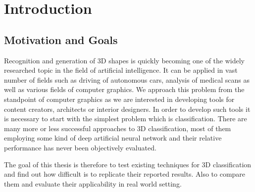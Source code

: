 \chapter{Introduction}
\label{sec:chap1}


\section{Motivation and Goals}
Recognition and generation of 3D shapes is quickly becoming one of the widely researched topic in the field of artificial intelligence. It can be applied in vast number of fields such as driving of autonomous cars, analysis of medical scans as well as various fields of computer graphics. We approach this problem from the standpoint of computer graphics as we are interested in developing tools for content creators, architects or interior designers. In order to develop such tools it is necessary to start with the simplest problem which is classification. 
There are many more or less successful approaches to 3D classification, most of them employing some kind of deep artificial neural network and their relative performance has never been objectively evaluated.\par
The goal of this thesis is therefore to test existing techniques for 3D classification and find out how difficult is to replicate their reported results. Also to compare them and evaluate their applicability in real world setting.
